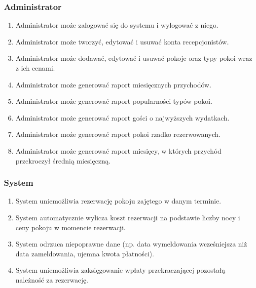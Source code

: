 \documentclass[12pt,a4paper]{article}
\begin{document}
\subsubsection*{Administrator}
\begin{enumerate}[label=F\arabic*., ref=F\arabic*, resume=wymagania]
    \item Administrator może zalogować się do systemu i wylogować z niego. \label{f:logowanieadmin}
    \item Administrator może tworzyć, edytować i usuwać konta recepcjonistów. \label{f:kontapracownikow}
    \item Administrator może dodawać, edytować i usuwać pokoje oraz typy pokoi wraz z ich cenami. \label{f:pokoje}
    \item Administrator może generować raport miesięcznych przychodów. \label{f:przychody}
    \item Administrator może generować raport popularności typów pokoi. \label{f:oblozenie}
    \item Administrator może generować raport gości o najwyższych
          wydatkach. \label{f:najlepsigoscie}

    \item Administrator może generować raport pokoi rzadko rezerwowanych. \label{f:rzadkie}
    \item Administrator może generować raport miesięcy, w których przychód przekroczył średnią miesięczną. \label{f:ponadsrednia}
\end{enumerate}

\subsubsection*{System}
\begin{enumerate}[label=F\arabic*., ref=F\arabic*, resume=wymagania]
    \item System uniemożliwia rezerwację pokoju zajętego w danym terminie. \label{f:kolizje}
    \item System automatycznie wylicza koszt rezerwacji na podstawie liczby nocy i ceny pokoju w momencie rezerwacji. \label{f:koszt}
    \item System odrzuca niepoprawne dane (np. data wymeldowania wcześniejsza niż data zameldowania, ujemna kwota płatności). \label{f:walidacja}
    \item System uniemożliwia zaksięgowanie wpłaty przekraczającej
    pozostałą należność za rezerwację. \label{f:nadplata}
\end{enumerate}
\end{document}
